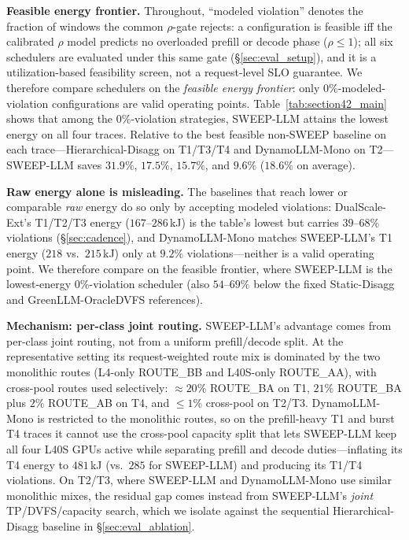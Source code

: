 \textbf{Feasible energy frontier.}
Throughout, ``modeled violation'' denotes the fraction of windows the common $\rho$-gate
rejects: a configuration is feasible iff the calibrated $\rho$ model predicts no overloaded
prefill or decode phase ($\rho{\leq}1$); all six schedulers are evaluated under this same
gate (\S\ref{sec:eval_setup}), and it is a utilization-based feasibility screen, not a
request-level SLO guarantee. We therefore compare schedulers on the \emph{feasible energy
frontier}: only $0\%$-modeled-violation configurations are valid operating points.
Table~\ref{tab:section42_main} shows that among the $0\%$-violation strategies, SWEEP-LLM
attains the lowest energy on all four traces. Relative to the best feasible non-SWEEP
baseline on each trace---Hierarchical-Disagg on T1/T3/T4 and DynamoLLM-Mono on T2---SWEEP-LLM
saves $31.9\%$, $17.5\%$, $15.7\%$, and $9.6\%$ ($18.6\%$ on average).

\textbf{Raw energy alone is misleading.}
The baselines that reach lower or comparable \emph{raw} energy do so only by accepting modeled violations: DualScale-Ext's T1/T2/T3 energy ($167$--$286$\,kJ) is the table's lowest but carries $39$--$68\%$ violations (\S\ref{sec:cadence}), and DynamoLLM-Mono matches SWEEP-LLM's T1 energy ($218$ vs.\ $215$\,kJ) only at $9.2\%$ violations---neither is a valid operating point.
We therefore compare on the feasible frontier, where SWEEP-LLM is the lowest-energy $0\%$-violation scheduler (also $54$--$69\%$ below the fixed Static-Disagg and GreenLLM-OracleDVFS references).

\textbf{Mechanism: per-class joint routing.}
SWEEP-LLM's advantage comes from per-class joint routing, not from a uniform
prefill/decode split. At the representative setting its request-weighted route mix is
dominated by the two monolithic routes (L4-only ROUTE\_BB and L40S-only ROUTE\_AA), with
cross-pool routes used selectively: $\approx$$20\%$ ROUTE\_BA on T1, $21\%$ ROUTE\_BA plus
$2\%$ ROUTE\_AB on T4, and $\leq$$1\%$ cross-pool on T2/T3. DynamoLLM-Mono is restricted to
the monolithic routes, so on the prefill-heavy T1 and burst T4 traces it cannot use the
cross-pool capacity split that lets SWEEP-LLM keep all four L40S GPUs active while
separating prefill and decode duties---inflating its T4 energy to $481$\,kJ (vs.\ $285$ for
SWEEP-LLM) and producing its T1/T4 violations. On T2/T3, where SWEEP-LLM and DynamoLLM-Mono
use similar monolithic mixes, the residual gap comes instead from SWEEP-LLM's \emph{joint}
TP/DVFS/capacity search, which we isolate against the sequential Hierarchical-Disagg
baseline in \S\ref{sec:eval_ablation}.

